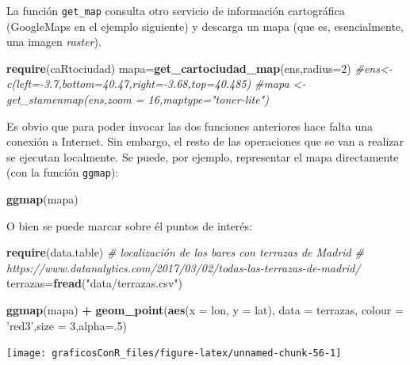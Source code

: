 \documentclass[]{article}
\newenvironment{Shaded}{\begin{snugshade}}{\end{snugshade}}
\newcommand{\CommentTok}[1]{\textcolor[rgb]{0.56,0.35,0.01}{\textit{#1}}}
\newcommand{\DataTypeTok}[1]{\textcolor[rgb]{0.13,0.29,0.53}{#1}}
\newcommand{\DecValTok}[1]{\textcolor[rgb]{0.00,0.00,0.81}{#1}}
\newcommand{\KeywordTok}[1]{\textcolor[rgb]{0.13,0.29,0.53}{\textbf{#1}}}
\newcommand{\NormalTok}[1]{#1}
\newcommand{\OperatorTok}[1]{\textcolor[rgb]{0.81,0.36,0.00}{\textbf{#1}}}
\newcommand{\StringTok}[1]{\textcolor[rgb]{0.31,0.60,0.02}{#1}}
\numberwithin{ejcnt}{section}
\begin{document}
La función \texttt{get\_map} consulta otro servicio de información cartográfica (GoogleMaps en el ejemplo siguiente) y descarga un mapa (que es, esencialmente, una imagen \emph{raster}).

\begin{Shaded}
\begin{Highlighting}[]
\KeywordTok{require}\NormalTok{(caRtociudad)}
\NormalTok{mapa=}\KeywordTok{get_cartociudad_map}\NormalTok{(ens,}\DataTypeTok{radius=}\DecValTok{2}\NormalTok{)}
\CommentTok{#ens<-c(left=-3.7,bottom=40.47,right=-3.68,top=40.485)}
\CommentTok{#mapa <- get_stamenmap(ens,zoom = 16,maptype="toner-lite")}
\end{Highlighting}
\end{Shaded}

Es obvio que para poder invocar las dos funciones anteriores hace falta una conexión a Internet. Sin embargo, el resto de las operaciones que se van a realizar se ejecutan localmente. Se puede, por ejemplo, representar el mapa directamente (con la función \texttt{ggmap}):

\begin{Shaded}
\begin{Highlighting}[]
\KeywordTok{ggmap}\NormalTok{(mapa)}
\end{Highlighting}
\end{Shaded}

O bien se puede marcar sobre él puntos de interés:

\begin{Shaded}
\begin{Highlighting}[]
\KeywordTok{require}\NormalTok{(data.table)}
\CommentTok{# localización de los bares con terrazas de Madrid}
\CommentTok{# https://www.datanalytics.com/2017/03/02/todas-las-terrazas-de-madrid/}
\NormalTok{terrazas=}\KeywordTok{fread}\NormalTok{(}\StringTok{"data/terrazas.csv"}\NormalTok{) }

\KeywordTok{ggmap}\NormalTok{(mapa) }\OperatorTok{+}\StringTok{ }\KeywordTok{geom_point}\NormalTok{(}\KeywordTok{aes}\NormalTok{(}\DataTypeTok{x =}\NormalTok{ lon, }\DataTypeTok{y =}\NormalTok{ lat), }\DataTypeTok{data =}\NormalTok{ terrazas, }\DataTypeTok{colour =} \StringTok{'red3'}\NormalTok{,}\DataTypeTok{size =} \DecValTok{3}\NormalTok{,}\DataTypeTok{alpha=}\NormalTok{.}\DecValTok{5}\NormalTok{)}
\end{Highlighting}
\end{Shaded}

\begin{center}\texttt{[image: graficosConR\_files/figure-latex/unnamed-chunk-56-1]} \end{center}
\end{document}

